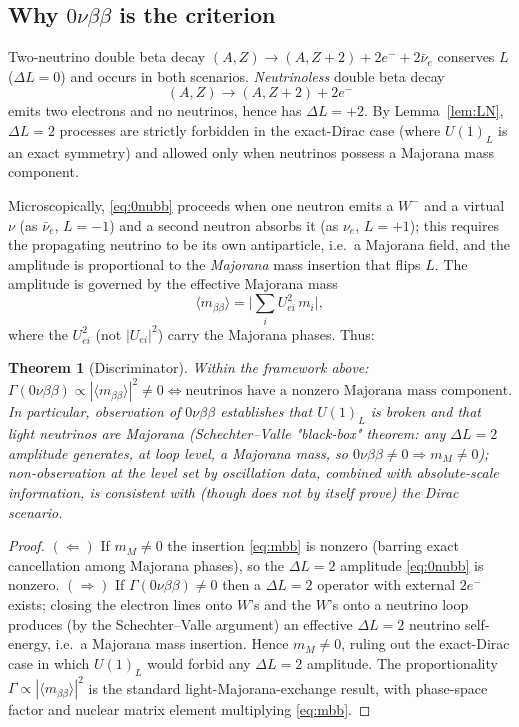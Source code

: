 \documentclass[12pt]{article}
\newtheorem{theorem}{Theorem}
\theoremstyle{definition}
\begin{document}
\subsection{Why $0\nu\beta\beta$ is the criterion}
Two-neutrino double beta decay
$(A,Z)\to(A,Z+2)+2e^-+2\bar\nu_e$ conserves $L$ ($\Delta L=0$) and occurs
in both scenarios. \emph{Neutrinoless} double beta decay
\begin{equation}\label{eq:0nubb}
(A,Z)\to(A,Z+2)+2e^-
\end{equation}
emits two electrons and no neutrinos, hence has $\Delta L=+2$. By
Lemma~\ref{lem:LN}, $\Delta L=2$ processes are strictly forbidden in the
exact-Dirac case (where $U(1)_L$ is an exact symmetry) and allowed only
when neutrinos possess a Majorana mass component.

Microscopically, \eqref{eq:0nubb} proceeds when one neutron emits a
$W^-$ and a virtual $\nu$ (as $\bar\nu_e$, $L=-1$) and a second neutron
absorbs it (as $\nu_e$, $L=+1$); this requires the propagating neutrino to
be its own antiparticle, i.e.\ a Majorana field, and the amplitude is
proportional to the \emph{Majorana} mass insertion that flips $L$. The
amplitude is governed by the effective Majorana mass
\begin{equation}\label{eq:mbb}
\langle m_{\beta\beta}\rangle
=\Big|\sum_i U_{ei}^2\,m_i\Big|,
\end{equation}
where the $U_{ei}^2$ (not $|U_{ei}|^2$) carry the Majorana phases. Thus:
\begin{theorem}[Discriminator]\label{thm:disc}
Within the framework above:
\[
\Gamma(0\nu\beta\beta)\propto |\langle m_{\beta\beta}\rangle|^2\neq0
\iff \text{neutrinos have a nonzero Majorana mass component.}
\]
In particular, observation of $0\nu\beta\beta$ establishes that
$U(1)_L$ is broken and that light neutrinos are Majorana
(Schechter–Valle "black-box" theorem: any $\Delta L=2$ amplitude
generates, at loop level, a Majorana mass, so $0\nu\beta\beta\neq0
\Rightarrow m_M\neq0$); non-observation at the level set by
oscillation data, combined with absolute-scale information, is consistent
with (though does not by itself prove) the Dirac scenario.
\end{theorem}
\begin{proof}
$(\Leftarrow)$ If $m_M\neq0$ the insertion \eqref{eq:mbb} is nonzero
(barring exact cancellation among Majorana phases), so the $\Delta L=2$
amplitude \eqref{eq:0nubb} is nonzero. $(\Rightarrow)$ If
$\Gamma(0\nu\beta\beta)\neq0$ then a $\Delta L=2$ operator with external
$2e^-$ exists; closing the electron lines onto $W$'s and the $W$'s onto a
neutrino loop produces (by the Schechter–Valle argument) an effective
$\Delta L=2$ neutrino self-energy, i.e.\ a Majorana mass insertion. Hence
$m_M\neq0$, ruling out the exact-Dirac case in which $U(1)_L$ would forbid
any $\Delta L=2$ amplitude. The proportionality
$\Gamma\propto|\langle m_{\beta\beta}\rangle|^2$ is the standard
light-Majorana-exchange result, with phase-space factor and nuclear
matrix element multiplying \eqref{eq:mbb}.
\end{proof}
\end{document}
